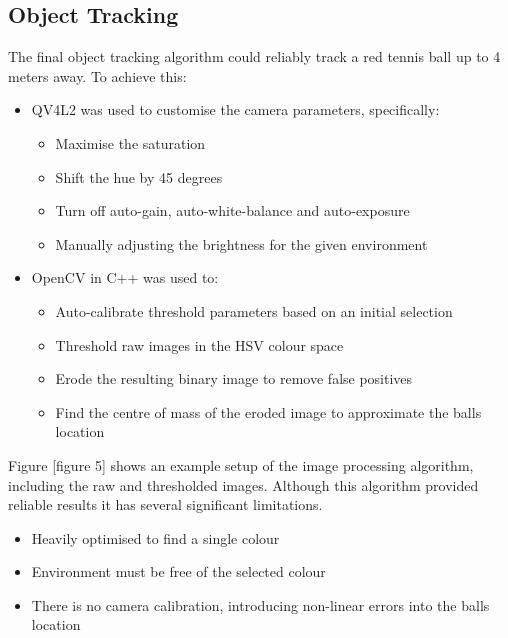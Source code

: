 \documentclass[conference]{IEEEtran}
\begin{document}
	\subsection{Object Tracking}
	The final object tracking algorithm could reliably track a red tennis ball up to 4 meters away. To achieve this:
	\begin{itemize}
		\item QV4L2 was used to customise the camera parameters, specifically:
		\begin{itemize}
			\item Maximise the saturation
			\item Shift the hue by 45 degrees
			
			\item Turn off auto-gain, auto-white-balance and auto-exposure
			
			\item Manually adjusting the brightness for the given environment
		\end{itemize}
		
		\item OpenCV in C++ was used to:
		\begin{itemize}
			\item Auto-calibrate threshold parameters based on an initial selection 
			
			\item Threshold raw images in the HSV colour space
			
			\item Erode the resulting binary image to remove false positives
			
			\item Find the centre of mass of the eroded image to approximate the balls location
		\end{itemize}
	\end{itemize}
	Figure [figure 5] shows an example setup of the image processing algorithm, including the raw and thresholded images. Although this algorithm provided reliable results it has several significant limitations.
	\begin{itemize}
		\item Heavily optimised to find a single colour
		
		\item Environment must be free of the selected colour
		
		\item There is no camera calibration, introducing non-linear errors into the balls location
	\end{itemize}
\end{document}
